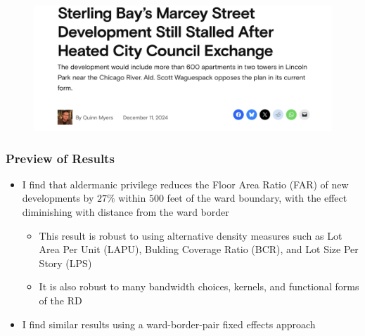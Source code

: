 \begin{frame}
\begin{minipage}{0.48\textwidth}
\begin{figure}
		\end{figure}
		\begin{figure}
			\centering
			\includegraphics[width=\textwidth]{images/sterling_bay_fight.png}
        \end{figure}
        \end{minipage}
\end{frame}

\begin{frame}
	\frametitle{Preview of Results}
	\begin{itemize}
		\item I find that aldermanic privilege reduces the Floor Area Ratio (FAR) of new developments by $27\%$ within $500$ feet of the ward boundary, with the effect diminishing with distance from the ward border
		\begin{itemize}
			\item This result is robust to using alternative density measures such as Lot Area Per Unit (LAPU), Bulding Coverage Ratio (BCR), and Lot Size Per Story (LPS)
			\item It is also robust to many bandwidth choices, kernels, and functional forms of the RD
		\end{itemize}
		\item I find similar results using a ward-border-pair fixed effects approach 
	\end{itemize}
\end{frame}